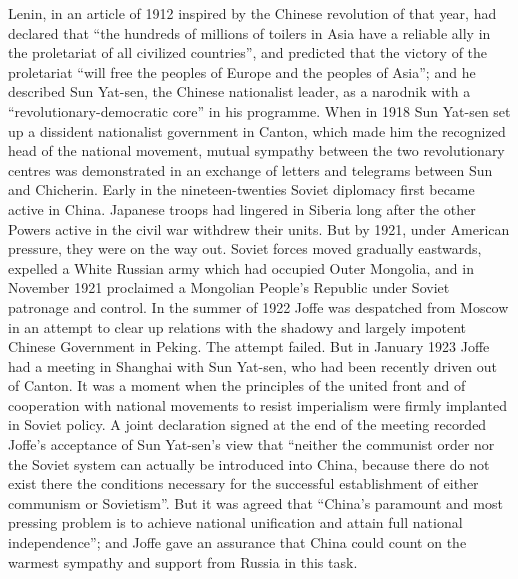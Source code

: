Lenin, in an article of 1912 inspired by the Chinese revolution of that year, had declared that ``the hundreds of millions of toilers in Asia have a reliable ally in the proletariat of all civilized countries'', and predicted that the victory of the proletariat ``will free the peoples of Europe and the peoples of Asia''; and he described Sun Yat-sen, the Chinese nationalist leader, as a narodnik with a ``revolutionary-democratic core'' in his programme. When in 1918 Sun Yat-sen set up a dissident nationalist government in Canton, which made him the recognized head of the national movement, mutual sympathy between the two revolutionary centres was demonstrated in an exchange of letters and telegrams between Sun and Chicherin. Early in the nineteen-twenties Soviet diplomacy first became active in China. Japanese troops had lingered in Siberia long after the other Powers active in the civil war withdrew their units. But by 1921, under American pressure, they were on the way out. Soviet forces moved gradually eastwards, expelled a White Russian army which had occupied Outer Mongolia, and in November 1921 proclaimed a Mongolian People's Republic under Soviet patronage and control. In the summer of 1922 Joffe was despatched from Moscow in an attempt to clear up relations with the shadowy and largely impotent Chinese Government in Peking. The attempt failed. But in January 1923 Joffe had a meeting in Shanghai with Sun Yat-sen, who had been recently driven out of Canton. It was a moment when the principles of the united front and of cooperation with national movements to resist imperialism were firmly implanted in Soviet policy. A joint declaration signed at the end of the meeting recorded Joffe's acceptance of Sun Yat-sen's view that ``neither the communist order nor the Soviet system can actually be introduced into China, because there do not exist there the conditions necessary for the successful establishment of either communism or Sovietism''. But it was agreed that ``China's paramount and most pressing problem is to achieve national unification and attain full national independence''; and Joffe gave an assurance that China could count on the warmest sympathy and support from Russia in this task. 

